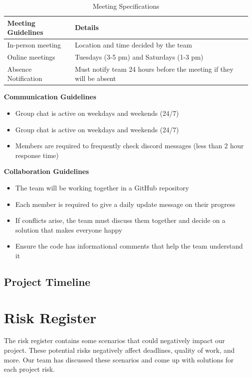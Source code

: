 \documentclass{article} %
\begin{document}
\begin{table}[H]
\caption{Meeting Specifications}
\begin{center}
\begin{tabular}{|l|l|}
\hline
\textbf{Meeting Guidelines} & \textbf{Details} \\ \hline
In-person meeting           & Location and time decided by the team \\ \hline
Online meetings             & Tuesdays (3-5 pm) and Saturdays (1-3 pm) \\ \hline
Absence Notification        & Must notify team 24 hours before the meeting if they will be absent \\ \hline
\end{tabular}
\end{center}
\end{table}

\textbf{Communication Guidelines}
\begin{itemize}
  \item Group chat is active on weekdays and weekends (24/7)
  \item Group chat is active on weekdays and weekends (24/7)
  \item Members are required to frequently check discord messages (less than 2 hour response time)
\end{itemize}

\textbf{Collaboration Guidelines}
\begin{itemize}
  \item The team will be working together in a GitHub repository
  \item Each member is required to give a daily update message on their progress
  \item If conflicts arise, the team must discuss them together and decide on a solution that makes everyone happy
  \item Ensure the code has informational comments that help the team understand it
\end{itemize}

\subsection{Project Timeline}



\section{Risk Register}
The risk register contains some scenarios that could negatively impact our project. 
These potential risks negatively affect deadlines, quality of work, and more. Our team has 
discussed these scenarios and come up with solutions for each project risk. 
\end{document}
